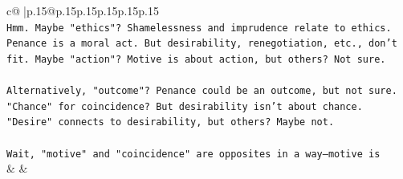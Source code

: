 \documentclass{article}
\begin{document}
{\begin{supertabular}{c@{$\;$}|p{.15\linewidth}@{}p{.15\linewidth}p{.15\linewidth}p{.15\linewidth}p{.15\linewidth}p{.15\linewidth}}
{{{\\ 
\texttt{Hmm. Maybe "ethics"? Shamelessness and imprudence relate to ethics. Penance is a moral act. But desirability, renegotiation, etc., don't fit. Maybe "action"? Motive is about action, but others? Not sure.} \\
\\ 
\texttt{Alternatively, "outcome"? Penance could be an outcome, but not sure. "Chance" for coincidence? But desirability isn't about chance. "Desire" connects to desirability, but others? Maybe not.} \\
\\ 
\texttt{Wait, "motive" and "coincidence" are opposites in a way—motive is} \\
            }
        }
    }
    & & \\ \\


\end{supertabular}}
\end{document}
